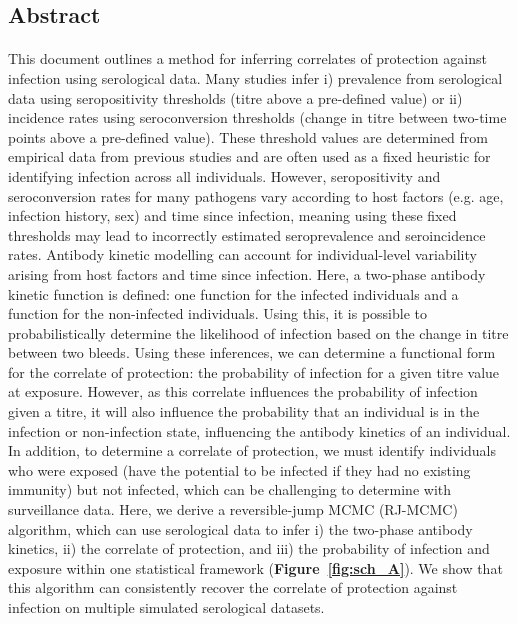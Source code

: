 \subsection*{Abstract}
\paragraph{}This document outlines a method for inferring correlates of protection against infection using serological data. Many studies infer i) prevalence from serological data using seropositivity thresholds (titre above a pre-defined value) or ii) incidence rates using seroconversion thresholds (change in titre between two-time points above a pre-defined value). These threshold values are determined from empirical data from previous studies and are often used as a fixed heuristic for identifying infection across all individuals. However, seropositivity and seroconversion rates for many pathogens vary according to host factors (e.g. age, infection history, sex) and time since infection, meaning using these fixed thresholds may lead to incorrectly estimated seroprevalence and seroincidence rates. Antibody kinetic modelling can account for individual-level variability arising from host factors and time since infection. Here, a two-phase antibody kinetic function is defined: one function for the infected individuals and a function for the non-infected individuals. Using this, it is possible to probabilistically determine the likelihood of infection based on the change in titre between two bleeds. Using these inferences, we can determine a functional form for the correlate of protection: the probability of infection for a given titre value at exposure. However, as this correlate influences the probability of infection given a titre, it will also influence the probability that an individual is in the infection or non-infection state, influencing the antibody kinetics of an individual. In addition, to determine a correlate of protection, we must identify individuals who were exposed (have the potential to be infected if they had no existing immunity) but not infected, which can be challenging to determine with surveillance data. Here, we derive a reversible-jump MCMC (RJ-MCMC) algorithm, which can use serological data to infer i) the two-phase antibody kinetics, ii) the correlate of protection, and iii) the probability of infection and exposure within one statistical framework (\textbf{Figure~\ref{fig:sch_A}}). We show that this algorithm can consistently recover the correlate of protection against infection on multiple simulated serological datasets.  

